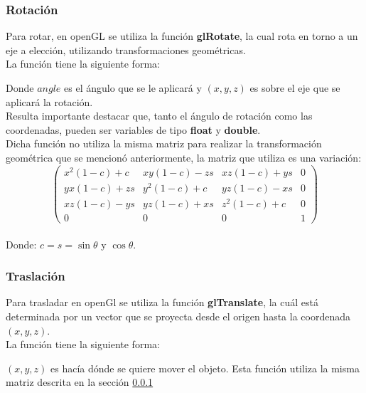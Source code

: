 \documentclass[12pt,journal,compsoc]{IEEEtran}
\begin{document}
\subsubsection{Rotación}
\label{rotacion}
Para rotar, en openGL se utiliza la función \textbf{glRotate}, la cual rota en torno a un eje a elección, utilizando transformaciones geométricas.\\La función tiene la siguiente forma:
%
 
%
Donde $angle$ es el ángulo que se le aplicará y $(x,y,z)$ es sobre el eje que se aplicará la rotación.\\Resulta importante destacar que, tanto el ángulo de rotación como las coordenadas, pueden ser variables de tipo \textbf{float} y \textbf{double}.
\\
Dicha función no utiliza la misma matriz para realizar la transformación geométrica que se mencionó anteriormente, la matriz que utiliza es una variación:\\

\[
	\left( 
		\begin{array}{cccc}
			x^{2}(1-c)+c & xy(1-c)-zs & xz(1-c)+ys & 0 \\
			yx(1-c)+zs & y^{2}(1-c)+c & yz(1-c)-xs & 0 \\
			xz(1-c)-ys & yz(1-c)+xs & z^{2}(1-c)+c & 0 \\
			0 & 0 & 0 & 1
		\end{array}
	\right)
\]\\

Donde: $c = s=\sin\theta$ y $\cos\theta$.
\subsubsection{Traslación}
Para trasladar en openGl se utiliza la función \textbf{glTranslate}, la cuál está determinada por un vector que se proyecta desde el origen hasta la coordenada $(x,y,z)$.\\La función tiene la siguiente forma:
%
 
%
$(x,y,z)$ es hacía dónde se quiere mover el objeto. Esta función utiliza la misma matriz descrita en la sección \ref{rotacion}
\end{document}

